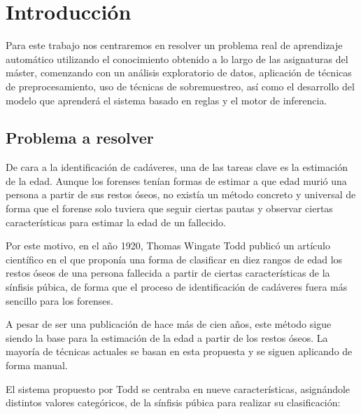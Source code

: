 \section{Introducción} \label{introduccion}



Para este trabajo nos centraremos en resolver un problema real de aprendizaje automático utilizando el conocimiento obtenido a lo largo de las asignaturas del máster, comenzando con un análisis exploratorio de datos, aplicación de técnicas de preprocesamiento, uso de técnicas de sobremuestreo, así como el desarrollo del modelo que aprenderá el sistema basado en reglas y el motor de inferencia.

\subsection{Problema a resolver}

De cara a la identificación de cadáveres, una de las tareas clave es la estimación de la edad. Aunque los forenses tenían formas de estimar a que edad murió una persona a partir de sus restos óseos, no existía un método concreto y universal de forma que el forense solo tuviera que seguir ciertas pautas y observar ciertas características para estimar la edad de un fallecido.

Por este motivo, en el año 1920, Thomas Wingate Todd publicó un artículo científico \cite{todd} en el que proponía una forma de clasificar en diez rangos de edad los restos óseos de una persona fallecida a partir de ciertas características de la sínfisis púbica, de forma que el proceso de identificación de cadáveres fuera más sencillo para los forenses.

A pesar de ser una publicación de hace más de cien años, este método sigue siendo la base para la estimación de la edad a partir de los restos óseos. La mayoría de técnicas actuales se basan en esta propuesta y se siguen aplicando de forma manual.

El sistema propuesto por Todd se centraba en nueve características, asignándole distintos valores categóricos, de la sínfisis púbica para realizar su clasificación:

